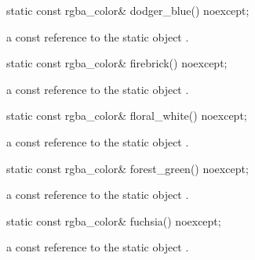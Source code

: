 \begin{itemdecl}
    static const rgba_color& dodger_blue() noexcept;
\end{itemdecl}
\begin{itemdescr}
    \pnum
    \returns
    a const reference to the static  object .
\end{itemdescr}

\begin{itemdecl}
    static const rgba_color& firebrick() noexcept;
\end{itemdecl}
\begin{itemdescr}
    \pnum
    \returns
    a const reference to the static  object .
\end{itemdescr}

\begin{itemdecl}
    static const rgba_color& floral_white() noexcept;
\end{itemdecl}
\begin{itemdescr}
    \pnum
    \returns
    a const reference to the static  object .
\end{itemdescr}

\begin{itemdecl}
    static const rgba_color& forest_green() noexcept;
\end{itemdecl}
\begin{itemdescr}
    \pnum
    \returns
    a const reference to the static  object .
\end{itemdescr}

\begin{itemdecl}
    static const rgba_color& fuchsia() noexcept;
\end{itemdecl}
\begin{itemdescr}
    \pnum
    \returns
    a const reference to the static  object .
\end{itemdescr}

